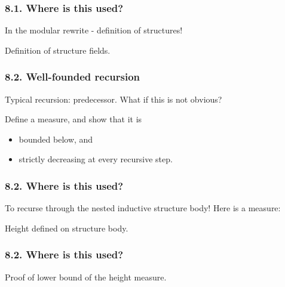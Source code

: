 \begin{frame}
  \frametitle{8.1. Where is this used?}
  In the modular rewrite - definition of structures!
  \begin{listing}[H]
      \caption{Definition of structure fields.}
    \end{listing}
\end{frame}

\begin{frame}
  \frametitle{8.2. Well-founded recursion}
  Typical recursion: predecessor. What if this is not obvious?\pause
  
  Define a measure, and show that it is
  \begin{itemize}
    \item bounded below, and
    \item strictly decreasing at every recursive step.
  \end{itemize}\pause
\end{frame}

\begin{frame}
  \frametitle{8.2. Where is this used?}
  To recurse through the nested inductive structure body! Here is a measure:
  \begin{listing}[H]
      \caption{Height defined on structure body.}
    \end{listing}
\end{frame}

\begin{frame}
  \frametitle{8.2. Where is this used?}
  \begin{listing}[H]
      \caption{Proof of lower bound of the height measure.}
      \label{lst:def-height-lb}
    \end{listing}
\end{frame}